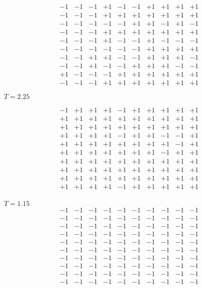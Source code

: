 \documentclass[12pt]{article}
\begin{document}
$$
\begin{matrix}
-1 & -1 & -1 & +1 & -1 & -1 & +1 & +1 & +1 & +1 \\
-1 & -1 & -1 & +1 & +1 & +1 & +1 & +1 & +1 & +1 \\
-1 & -1 & -1 & -1 & -1 & +1 & +1 & -1 & +1 & -1 \\
-1 & -1 & -1 & +1 & +1 & +1 & +1 & +1 & +1 & +1 \\
-1 & -1 & -1 & +1 & -1 & -1 & +1 & -1 & -1 & -1 \\
-1 & -1 & -1 & -1 & -1 & -1 & +1 & +1 & +1 & +1 \\
-1 & -1 & +1 & +1 & -1 & -1 & +1 & +1 & +1 & -1 \\
-1 & -1 & +1 & -1 & -1 & +1 & +1 & +1 & -1 & -1 \\
+1 & -1 & -1 & -1 & +1 & +1 & +1 & +1 & +1 & +1 \\
-1 & -1 & -1 & +1 & +1 & +1 & +1 & +1 & +1 & +1
\end{matrix}
$$

\newpage

$T = 2.25$

$$
\begin{matrix}
-1 & +1 & +1 & +1 & -1 & +1 & +1 & +1 & +1 & +1 \\
+1 & +1 & +1 & +1 & +1 & +1 & +1 & +1 & +1 & +1 \\
+1 & +1 & +1 & +1 & +1 & +1 & +1 & +1 & +1 & +1 \\
+1 & +1 & +1 & +1 & -1 & +1 & +1 & -1 & -1 & +1 \\
+1 & +1 & +1 & +1 & +1 & +1 & +1 & +1 & -1 & +1 \\
+1 & +1 & +1 & +1 & +1 & +1 & +1 & -1 & +1 & +1 \\
+1 & +1 & +1 & +1 & +1 & +1 & +1 & +1 & +1 & +1 \\
+1 & +1 & +1 & +1 & +1 & +1 & +1 & +1 & +1 & +1 \\
+1 & +1 & +1 & +1 & +1 & +1 & +1 & +1 & +1 & +1 \\
+1 & +1 & +1 & +1 & -1 & +1 & +1 & +1 & +1 & +1 \\
\end{matrix}
$$


$T = 1.15$
$$
\begin{matrix}
-1 & -1 & -1 & -1 & -1 & -1 & -1 & -1 & -1 & -1 \\
-1 & -1 & -1 & -1 & -1 & -1 & -1 & -1 & -1 & -1 \\
-1 & -1 & -1 & -1 & -1 & -1 & -1 & -1 & -1 & -1 \\
-1 & -1 & -1 & -1 & -1 & -1 & -1 & -1 & -1 & -1 \\
-1 & -1 & -1 & -1 & -1 & -1 & -1 & -1 & -1 & -1 \\
-1 & -1 & -1 & -1 & -1 & -1 & -1 & -1 & -1 & -1 \\
-1 & -1 & -1 & -1 & -1 & -1 & -1 & -1 & -1 & -1 \\
-1 & -1 & -1 & -1 & -1 & -1 & -1 & -1 & -1 & -1 \\
-1 & -1 & -1 & -1 & -1 & -1 & -1 & -1 & -1 & -1 \\
-1 & -1 & -1 & -1 & -1 & -1 & -1 & -1 & -1 & -1
\end{matrix}
$$
\end{document}
